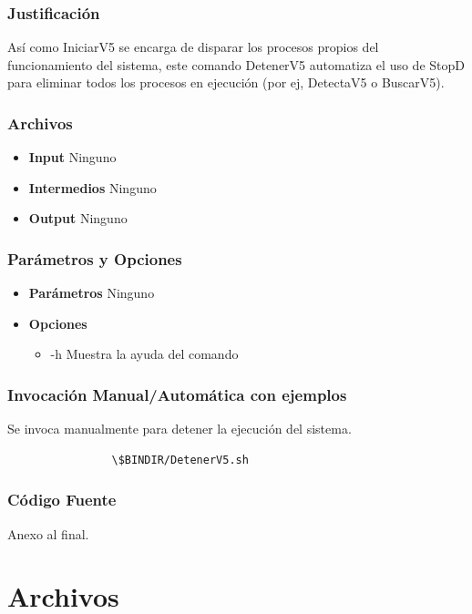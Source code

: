 \documentclass[a4paper,10pt,titlepage]{article}
\begin{document}
		\subsubsection{Justificaci\'on}
			As\'i como IniciarV5 se encarga de disparar los procesos propios del funcionamiento del sistema, este comando DetenerV5 automatiza el uso de StopD para eliminar todos los procesos en ejecuci\'on (por ej, DetectaV5 o BuscarV5). 

		\subsubsection{Archivos}
			\begin {itemize}
				\item \textbf{Input } {Ninguno}
				\item \textbf{Intermedios } {Ninguno}
				\item \textbf{Output } {Ninguno}
			\end{itemize}

		\subsubsection{Par\'ametros y Opciones}
			\begin {itemize}
				\item \textbf{Par\'ametros} { Ninguno }
				\item \textbf{Opciones}{
					\begin{itemize}
						\item {-h }{Muestra la ayuda del comando} 
					\end{itemize}
				}
			\end{itemize}
	
		\subsubsection{Invocaci\'on Manual/Autom\'atica con ejemplos}
			Se invoca manualmente para detener la ejecuci\'on del sistema.
			\begin{verbatim}
				\$BINDIR/DetenerV5.sh
			\end{verbatim}

		\subsubsection{C\'odigo Fuente}
			Anexo al final.

\section{Archivos}
\end{document}
